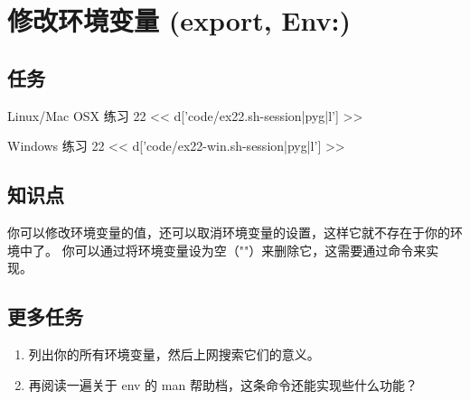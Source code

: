 \chapter{修改环境变量 (export, Env:)}

\section{任务}

\begin{code}{Linux/Mac OSX 练习 22}
<< d['code/ex22.sh-session|pyg|l'] >>
\end{code}

\begin{code}{Windows 练习 22}
<< d['code/ex22-win.sh-session|pyg|l'] >>
\end{code}

\section{知识点}

你可以修改环境变量的值，还可以取消环境变量的设置，这样它就不存在于你的环境中了。
你可以通过将环境变量设为空（""）来删除它，这需要通过命令来实现。

\section{更多任务}

\begin{enumerate}
\item 列出你的所有环境变量，然后上网搜索它们的意义。
\item 再阅读一遍关于 env 的 man 帮助档，这条命令还能实现些什么功能？
\end{enumerate}

